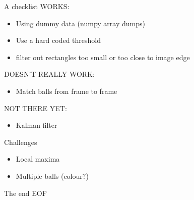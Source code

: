 \documentclass{beamer}
\begin{document}
\begin{frame}{A checklist}
WORKS:

\begin{itemize}
\item Using dummy data (numpy array dumps)\\
\item Use a hard coded threshold\\
\item filter out rectangles too small or too close to image edge
\end{itemize}

DOESN'T REALLY WORK:

\begin{itemize}
 \item Match balls from frame to frame
\end{itemize}

NOT THERE YET:
\begin{itemize}
 \item Kalman filter
\end{itemize}

\end{frame}



\begin{frame}{Challenges}
\begin{itemize}
	\item Local maxima
	\item Multiple balls (colour?)
\end{itemize}
\end{frame}

\begin{frame}{The end}
EOF
\end{frame}
\end{document}
